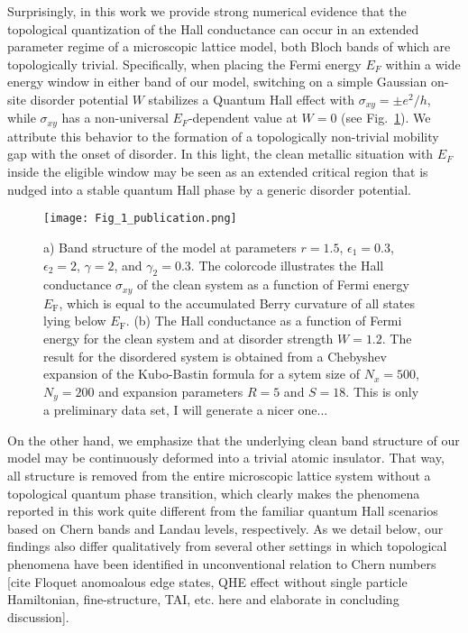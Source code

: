 \documentclass[aps,prl,amsmath,amssymb,twocolumn]{revtex4-2}
\newcommand{\BM}[1]{{\color{orange} #1}}
\begin{document}
Surprisingly, in this work we provide strong numerical evidence that the topological quantization of the Hall conductance can occur in an extended parameter regime of a microscopic lattice model, both Bloch bands of which are topologically trivial. Specifically, when placing the Fermi energy $E_F$ within a wide energy window in either band of our model, switching on a simple Gaussian on-site disorder potential $W$ stabilizes a Quantum Hall effect with $\sigma_{xy} = \pm e^2/h$, while $\sigma_{xy}$ has a non-universal $E_F$-dependent value at $W=0$ (see Fig.~\ref{fig:one}). We attribute this behavior to the formation of a topologically non-trivial mobility gap with the onset of disorder. In this light, the clean metallic situation with $E_F$ inside the eligible window may be seen as an extended critical region that is nudged into a stable quantum Hall phase by a generic disorder potential.
 
\begin{figure}[htp!]	 
{\texttt{[image: Fig\_1\_publication.png]}}
\caption{a) Band structure of the model at parameters $r = 1.5$, $\epsilon_1 = 0.3$, $\epsilon_2 = 2$, $\gamma  =2$, and $\gamma_2 = 0.3$. The colorcode illustrates the Hall conductance $\sigma_{xy}$ of the clean system as a function of Fermi energy $E_\mathrm{F}$, which is equal to the accumulated Berry curvature of all states lying below $E_\mathrm{F}$. (b) The Hall conductance as a function of Fermi energy for the clean system and at disorder strength $W = 1.2$. The result for the disordered system is obtained from a Chebyshev expansion of the Kubo-Bastin formula for a sytem size of $N_x = 500$, $N_y = 200$ and expansion parameters $R = 5$ and $S = 18$. \BM{This is only a preliminary data set, I will generate a nicer one...}
 }\label{fig:one}
\end{figure}

On the other hand, we emphasize that the underlying clean band structure of our model may be continuously deformed into a trivial atomic insulator. That way, all structure is removed from the entire microscopic lattice system without a topological quantum phase transition, which clearly makes the phenomena reported in this work quite different from the familiar quantum Hall scenarios based on Chern bands and Landau levels, respectively. As we detail below, our findings also differ qualitatively from several other settings in which topological phenomena have been identified in unconventional relation to Chern numbers [cite Floquet anomoalous edge states, QHE effect without single particle Hamiltonian, fine-structure, TAI, etc. here and elaborate in concluding discussion].
\end{document}
